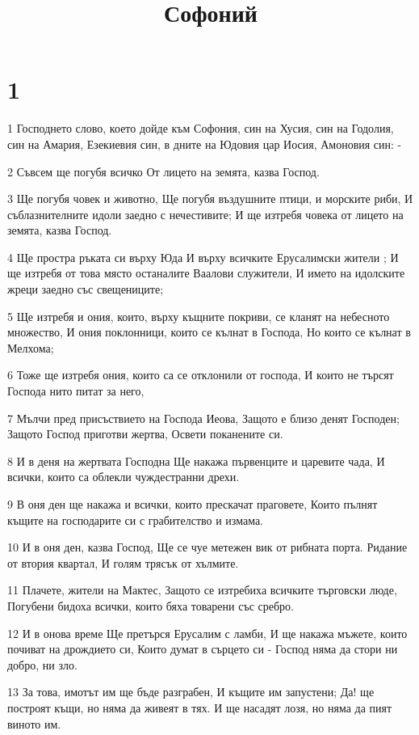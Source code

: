 

\title{Софоний}


\chapter{1}

\par 1 Господнето слово, което дойде към Софония, син на Хусия, син на Годолия, син на Амария, Езекиевия син, в дните на Юдовия цар Иосия, Амоновия син: -
\par 2 Съвсем ще погубя всичко От лицето на земята, казва Господ.
\par 3 Ще погубя човек и животно, Ще погубя въздушните птици, и морските риби, И съблазнителните идоли заедно с нечестивите; И ще изтребя човека от лицето на земята, казва Господ.
\par 4 Ще простра ръката си върху Юда И върху всичките Ерусалимски жители ; И ще изтребя от това място останалите Ваалови служители, И името на идолските жреци заедно със свещениците;
\par 5 Ще изтребя и ония, които, върху къщните покриви, се кланят на небесното множество, И ония поклонници, които се кълнат в Господа, Но които се кълнат в Мелхома;
\par 6 Тоже ще изтребя ония, които са се отклонили от господа, И които не търсят Господа нито питат за него,
\par 7 Мълчи пред присъствието на Господа Иеова, Защото е близо денят Господен; Защото Господ приготви жертва, Освети поканените си.
\par 8 И в деня на жертвата Господна Ще накажа първенците и царевите чада, И всички, които са облекли чуждестранни дрехи.
\par 9 В оня ден ще накажа и всички, които прескачат праговете, Които пълнят къщите на господарите си с грабителство и измама.
\par 10 И в оня ден, казва Господ, Ще се чуе метежен вик от рибната порта. Ридание от втория квартал, И голям трясък от хълмите.
\par 11 Плачете, жители на Мактес, Защото се изтребиха всичките търговски люде, Погубени бидоха всички, които бяха товарени със сребро.
\par 12 И в онова време Ще претърся Ерусалим с ламби, И ще накажа мъжете, които почиват на дрождието си, Които думат в сърцето си - Господ няма да стори ни добро, ни зло.
\par 13 За това, имотът им ще бъде разграбен, И къщите им запустени; Да! ще построят къщи, но няма да живеят в тях. И ще насадят лозя, но няма да пият виното им.

